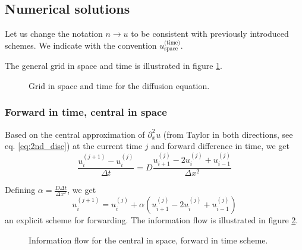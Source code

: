 
\subsection{Numerical solutions}
Let us change the notation $n \rightarrow u$ to be consistent with previously introduced schemes.
We indicate with the convention $u_{\text{space}}^{\text{(time)}}$.


The general grid in space and time is illustrated in figure \ref{fig:diff_grid}.

\begin{figure}[h]
    \centering
    
    \caption{Grid in space and time for the diffusion equation.}
    \label{fig:diff_grid}
\end{figure}

\subsubsection{Forward in time, central in space}
Based on the central approximation of $\partial_x^2 u$ (from Taylor in 
both directions, see eq. \ref{eq:2nd_disc}) at the current
time $j$ and forward difference in time, we get
\begin{equation}
    \frac{u_i^{(j+1)} - u_i^{(j)}}{\Delta t} = D \frac{u_{i+1}^{(j)}-2 u_{i}^{(j)}+u_{i-1}^{(j)}}{\Delta x^2}
\end{equation}

Defining $\alpha = \frac{D \Delta t}{\Delta x^2}$, we get
\begin{equation}
    u_i^{(j+1)} = u_i^{(j)} + \alpha \left( u_{i+1}^{(j)} - 2 u_i^{(j)} + u_{i-1}^{(j)} \right)
\end{equation}
an explicit scheme for forwarding. The information flow is illustrated in 
figure \ref{fig:diff_explicit}.

\begin{figure}[h]
    \centering
    
    \caption{Information flow for the central in space, forward in time scheme.}
    \label{fig:diff_explicit}
\end{figure}

